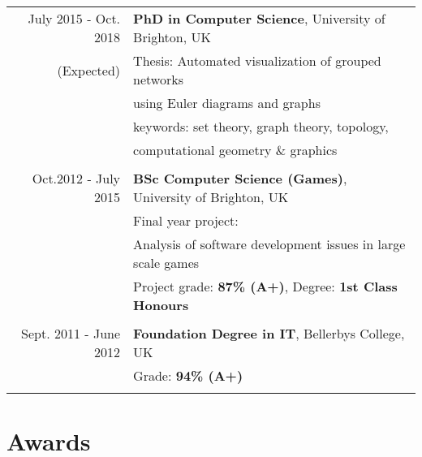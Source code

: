 \documentclass[a4paper,11pt]{article} %
\begin{document}
\begin{tabular}{r|p{11cm}}
July 2015 - Oct. 2018 & \textbf{PhD in Computer Science}, University of Brighton, UK\\
(Expected)& Thesis: Automated visualization of grouped networks\\
& using Euler diagrams and graphs\\
& keywords: set theory, graph theory, topology,\\
& computational geometry \& graphics \\
\multicolumn{2}{c}{} \\

	
Oct.2012 - July 2015 & \textbf{BSc Computer Science (Games)}, University of Brighton, UK\\
& Final year project: \\
& Analysis of software development issues in large scale games\\
&\normalsize Project grade: \textbf{87\% (A+)}, Degree: \textbf{1st Class Honours} \\
\multicolumn{2}{c}{} \\


Sept. 2011 - June 2012 & \textbf{Foundation Degree in IT}, Bellerbys College, UK\\
&\normalsize Grade: \textbf{94\% (A+)} \\
\multicolumn{2}{c}{} \\

\end{tabular}




\section{Awards}
\end{document}
